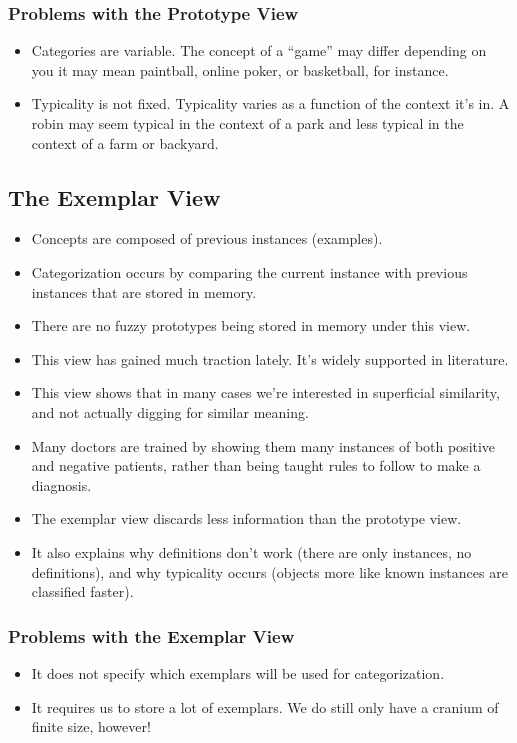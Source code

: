 \documentclass[]{article}
\begin{document}
			\subsubsection{Problems with the Prototype View}
				\begin{itemize}
					\item Categories are variable. The concept of a ``game'' may differ depending on you \textendash{} it may mean paintball, online poker, or basketball, for instance.
					\item Typicality is not fixed. Typicality varies as a function of the context it's in. A robin may seem typical in the context of a park and less typical in the context of a farm or backyard.
				\end{itemize}

		\subsection{The Exemplar View}
			\begin{itemize}
				\item Concepts are composed of previous instances (examples).
				\item Categorization occurs by comparing the current instance with previous instances that are stored in memory.
				\item There are no fuzzy prototypes being stored in memory under this view.
				\item This view has gained much traction lately. It's widely supported in literature.
				\item This view shows that in many cases we're interested in superficial similarity, and not actually digging for similar meaning.
				\item Many doctors are trained by showing them many instances of both positive and negative patients, rather than being taught rules to follow to make a diagnosis.
				\item The exemplar view discards less information than the prototype view.
				\item It also explains why definitions don't work (there are only instances, no definitions), and why typicality occurs (objects more like known instances are classified faster).
			\end{itemize}

			\subsubsection{Problems with the Exemplar View}
				\begin{itemize}
					\item It does not specify which exemplars will be used for categorization.
					\item It requires us to store a lot of exemplars. We do still only have a cranium of finite size, however!
				\end{itemize}
\end{document}
